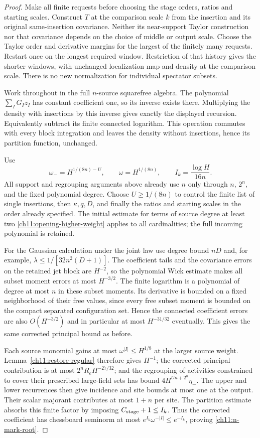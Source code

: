 \begin{proof}
Make all finite requests before choosing the stage orders,
ratios and starting scales. Construct $T$ at the comparison scale $k$ from
the insertion and its original same-insertion covariance.
Neither its near-support Taylor construction nor that covariance
depends on the choice of middle or output scale.
Choose the Taylor order and derivative margins for the
largest of the finitely many requests. Restart once on the
longest required window. Restriction of that history gives
the shorter windows, with unchanged localization map and density at the comparison scale.
There is no new normalization for individual spectator subsets.

Work throughout in the full $n$-source squarefree algebra.
The polynomial $\sum_I G_Iz_I$ has constant coefficient one,
so its inverse exists there. Multiplying the density with insertions
by this inverse gives exactly the displayed recursion.
Equivalently subtract its finite connected logarithm.
This operation commutes with every block integration and leaves
the density without insertions, hence its partition function, unchanged.

Use
\[
 \omega_-=H^{1/(8n)-U},\qquad
 \omega=H^{1/(8n)},\qquad I_k=\frac{\log H}{16n}.
\]
All support and regrouping arguments above already use $n$
only through $n$, $2^n$, and the fixed polynomial degree.
Choose $U\ge1/(8n)$ to control the finite list of single insertions,
then $\kappa,q,D$, and finally the ratios and starting scales in the
order already specified. The initial estimate for terms of source degree at least two
\eqref{ch11:opening-higher-weight} applies to all cardinalities;
the full incoming polynomial is retained.

For the Gaussian calculation under the joint law use degree bound $nD$
and, for example, $\lambda\le1/[32n^2(D+1)]$.
The coefficient tails and the covariance errors on the retained jet block are
$H^{-2}$, so the polynomial Wick estimate makes all subset
moment errors at most $H^{-3/2}$.
The finite logarithm is a polynomial of degree at most $n$
in these subset moments. Its derivative is bounded on a fixed
neighborhood of their free values, since every free subset
moment is bounded on the compact separated configuration set.
Hence the connected coefficient errors are also $O(H^{-3/2})$
and in particular at most $H^{-31/32}$ eventually.
This gives the same corrected principal bound as before.

Each source monomial gains at most
$\omega^{|I|}\le H^{1/8}$ at the larger source weight.
Lemma~\ref{ch11:restore-regular} therefore gives $H^{-1}$;
the corrected principal contribution is at most
$2^nR_eH^{-27/32}$; and the regrouping of activities constrained to cover their prescribed large-field sets has bound
$4H^{Un+2^n}\eta_-$.
The upper and lower recurrences then give incidence and site
bounds at most one at the output. Their scalar majorant contributes
at most $1+n$ per site. The partition
estimate absorbs this finite factor by imposing
$C_{\rm stage}+1\le I_k$.
Thus the corrected coefficient has chessboard seminorm at most
$e^{I_k}\omega^{-|I|}\le e^{-I_k}$, proving
\eqref{ch11:n-mark-root}.


\end{proof}
